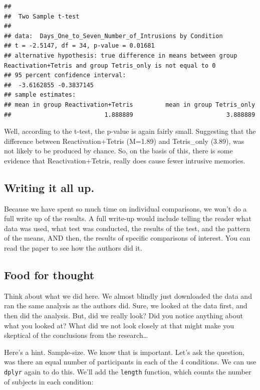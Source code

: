 \documentclass[
]{book}
\begin{document}
\begin{verbatim}
## 
##  Two Sample t-test
## 
## data:  Days_One_to_Seven_Number_of_Intrusions by Condition
## t = -2.5147, df = 34, p-value = 0.01681
## alternative hypothesis: true difference in means between group Reactivation+Tetris and group Tetris_only is not equal to 0
## 95 percent confidence interval:
##  -3.6162855 -0.3837145
## sample estimates:
## mean in group Reactivation+Tetris         mean in group Tetris_only 
##                          1.888889                          3.888889
\end{verbatim}

Well, according to the t-test, the p-value is again fairly small. Suggesting that the difference between Reactivation+Tetris (M=1.89) and Tetris\_only (3.89), was not likely to be produced by chance. So, on the basis of this, there is some evidence that Reactivation+Tetris, really does cause fewer intrusive memories.

\hypertarget{writing-it-all-up.}{%
\subsection{Writing it all up.}\label{writing-it-all-up.}}

Because we have spent so much time on individual comparisons, we won't do a full write up of the results. A full write-up would include telling the reader what data was used, what test was conducted, the results of the test, and the pattern of the means, AND then, the results of specific comparisons of interest. You can read the paper to see how the authors did it.

\hypertarget{food-for-thought}{%
\subsection{Food for thought}\label{food-for-thought}}

Think about what we did here. We almost blindly just downloaded the data and ran the same analysis as the authors did. Sure, we looked at the data first, and then did the analysis. But, did we really look? Did you notice anything about what you looked at? What did we not look closely at that might make you skeptical of the conclusions from the research\ldots{}

Here's a hint. Sample-size. We know that is important. Let's ask the question, was there an equal number of participants in each of the 4 conditions. We can use \texttt{dplyr} again to do this. We'll add the \texttt{length} function, which counts the number of subjects in each condition:
\end{document}
